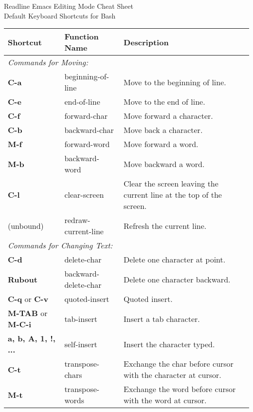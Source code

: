 \documentclass{article}
\begin{document}
\begin{center}
\Large Readline Emacs Editing Mode Cheat Sheet \\
\Large Default Keyboard Shortcuts for Bash
\end{center}

\vspace{0.4in}

\renewcommand{\arraystretch}{1.2}
\begin{tabular}{|p{3.5cm}|p{4cm}|p{10cm}|}
\hline
\large\textbf{Shortcut} & \large\textbf{Function Name} & \large\textbf{Description} \\
\hline
\multicolumn{3}{|l|}{\small\it{Commands for Moving:}} \\
\hline
\textbf{C-a} & beginning-of-line & Move to the beginning of line. \\
\hline
\textbf{C-e} & end-of-line & Move to the end of line. \\
\hline
\textbf{C-f} & forward-char & Move forward a character. \\
\hline
\textbf{C-b} & backward-char & Move back a character. \\
\hline
\textbf{M-f} & forward-word & Move forward a word. \\
\hline
\textbf{M-b} & backward-word & Move backward a word. \\
\hline
\textbf{C-l} & clear-screen & Clear the screen leaving the current line at the top of the screen. \\
\hline
(unbound) & redraw-current-line & Refresh the current line. \\
\hline
\multicolumn{3}{|l|}{\small\it{Commands for Changing Text:}} \\
\hline
\textbf{C-d} & delete-char & Delete one character at point. \\
\hline
\textbf{Rubout} & backward-delete-char & Delete one character backward. \\
\hline
\textbf{C-q} or \textbf{C-v} & quoted-insert & Quoted insert. \\
\hline
\textbf{M-TAB} or \textbf{M-C-i} & tab-insert & Insert a tab character. \\
\hline
\textbf{a, b, A, 1, !, ...} & self-insert & Insert the character typed. \\
\hline
\textbf{C-t} & transpose-chars & Exchange the char before cursor with the character at cursor. \\
\hline
\textbf{M-t} & transpose-words & Exchange the word before cursor with the word at cursor. \\

\end{tabular}
\end{document}
